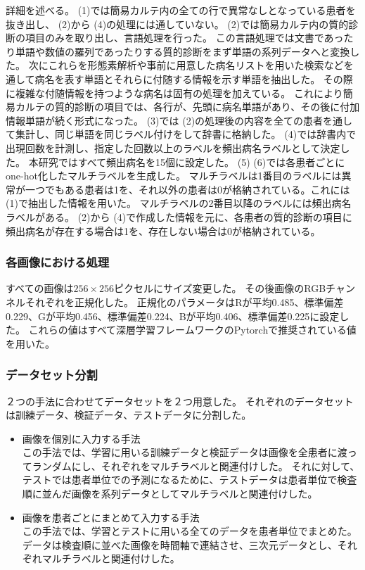 詳細を述べる。
 (1)では簡易カルテ内の全ての行で異常なしとなっている患者を抜き出し、 (2)から (4)の処理には通していない。
 (2)では簡易カルテ内の質的診断の項目のみを取り出し、言語処理を行った。
この言語処理では文書であったり単語や数値の羅列であったりする質的診断をまず単語の系列データへと変換した。
次にこれらを形態素解析や事前に用意した病名リストを用いた検索などを通して病名を表す単語とそれらに付随する情報を示す単語を抽出した。
その際に複雑な付随情報を持つような病名は固有の処理を加えている。
これにより簡易カルテの質的診断の項目では、各行が、先頭に病名単語があり、その後に付加情報単語が続く形式になった。 
(3)では (2)の処理後の内容を全ての患者を通して集計し、同じ単語を同じラベル付けをして辞書に格納した。 
(4)では辞書内で出現回数を計測し、指定した回数以上のラベルを頻出病名ラベルとして決定した。
本研究ではすべて頻出病名を15個に設定した。
 (5) (6)では各患者ごとにone-hot化したマルチラベルを生成した。
マルチラベルは1番目のラベルには異常が一つでもある患者は1を、それ以外の患者は0が格納されている。これには (1)で抽出した情報を用いた。
マルチラベルの2番目以降のラベルには頻出病名ラベルがある。 
(2)から (4)で作成した情報を元に、各患者の質的診断の項目に頻出病名が存在する場合は1を、存在しない場合は0が格納されている。
\subsubsection{各画像における処理}
すべての画像は$256 \times 256$ピクセルにサイズ変更した。
その後画像のRGBチャンネルそれぞれを正規化した。
正規化のパラメータはRが平均0.485、標準偏差0.229、Gが平均0.456、標準偏差0.224、Bが平均0.406、標準偏差0.225に設定した。
これらの値はすべて深層学習フレームワークのPytorchで推奨されている値を用いた。
\subsubsection{データセット分割}
２つの手法に合わせてデータセットを２つ用意した。
それぞれのデータセットは訓練データ、検証データ、テストデータに分割した。
\begin{itemize}
    \item 画像を個別に入力する手法\\
この手法では、学習に用いる訓練データと検証データは画像を全患者に渡ってランダムにし、それぞれをマルチラベルと関連付けした。
それに対して、テストでは患者単位での予測になるために、テストデータは患者単位で検査順に並んだ画像を系列データとしてマルチラベルと関連付けした。
    \item 画像を患者ごとにまとめて入力する手法\\
この手法では、学習とテストに用いる全てのデータを患者単位でまとめた。
データは検査順に並べた画像を時間軸で連結させ、三次元データとし、それぞれマルチラベルと関連付けした。
\end{itemize}

